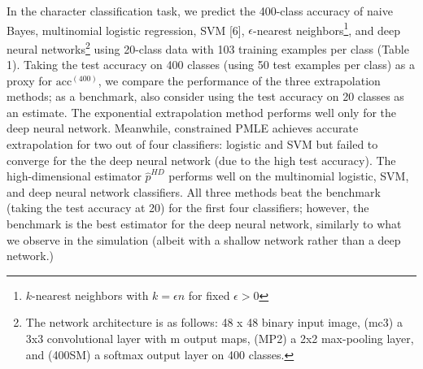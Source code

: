 \documentclass{article}
\begin{document}
In the character classification task, we predict the 400-class accuracy of naive Bayes, multinomial
logistic regression, SVM [6], $\epsilon$-nearest neighbors\footnote{$k$-nearest neighbors with $k = \epsilon n$ for fixed $\epsilon > 0$}, and deep neural networks\footnote{The network architecture is as follows: 48 x 48 binary input image, (mc3) a 3x3 convolutional layer with m output maps, (MP2) a 2x2 max-pooling layer, and (400SM) a softmax output layer on 400 classes.} using 20-class data with 103 training examples per class (Table 1).
Taking the test accuracy on 400 classes (using 50 test examples per class) as a proxy for $\text{acc}^{(400)}$,
we compare the performance of the three extrapolation methods; as a benchmark,
also consider using the test accuracy on 20 classes as an estimate.
The exponential extrapolation method performs well only for the deep neural network.  Meanwhile, constrained PMLE achieves accurate extrapolation for two out of four classifiers: logistic and SVM
but failed to converge for the the deep neural network (due to the high test accuracy).
The high-dimensional estimator $\hat{p}^{HD}$  performs well on the multinomial logistic, SVM, and deep neural network classifiers.  All three methods beat the benchmark (taking the test accuracy at 20) for the first four classifiers;
however, the benchmark is the best estimator for the deep neural network,
similarly to what we observe in the simulation (albeit with a shallow network rather than a deep network.)
\end{document}
